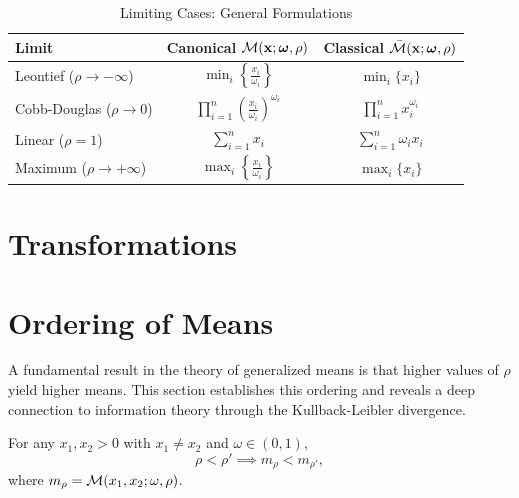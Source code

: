 \begin{table}[h!]
\centering
\caption{Limiting Cases: General Formulations}
\label{tab:general-limits}
\begin{tabular}{@{}lcc@{}}
\toprule
\textbf{Limit} & \textbf{Canonical $\mathcal{M}(\mathbf{x}; \boldsymbol{\omega}, \rho)$} & \textbf{Classical $\bar{\mathcal{M}}(\mathbf{x}; \boldsymbol{\omega}, \rho)$} \\
\midrule
Leontief ($\rho \to -\infty$) & $\displaystyle\min_i \left\{ \frac{x_i}{\omega_i} \right\}$ & $\displaystyle\min_i \{ x_i \}$ \\[12pt]
Cobb-Douglas ($\rho \to 0$) & $\displaystyle\prod_{i=1}^n \left( \frac{x_i}{\omega_i} \right)^{\omega_i}$ & $\displaystyle\prod_{i=1}^n x_i^{\omega_i}$ \\[12pt]
Linear ($\rho = 1$) & $\displaystyle\sum_{i=1}^n x_i$ & $\displaystyle\sum_{i=1}^n \omega_i x_i$ \\[12pt]
Maximum ($\rho \to +\infty$) & $\displaystyle\max_i \left\{ \frac{x_i}{\omega_i} \right\}$ & $\displaystyle\max_i \{ x_i \}$ \\[6pt]
\bottomrule
\end{tabular}
\end{table}

\section{Transformations}
\label{sec:transformations}



\section{Ordering of Means}
\label{sec:ordering}

A fundamental result in the theory of generalized means is that higher values of $\rho$ yield higher means. This section establishes this ordering and reveals a deep connection to information theory through the Kullback-Leibler divergence.

\begin{proposition}
\label{prop:ordering}
For any $x_1, x_2 > 0$ with $x_1 \neq x_2$ and $\omega \in (0,1)$,
\begin{equation}
\rho < \rho' \implies m_\rho < m_{\rho'},
\end{equation}
where $m_\rho = \mathcal{M}(x_1, x_2; \omega, \rho)$.
\end{proposition}

